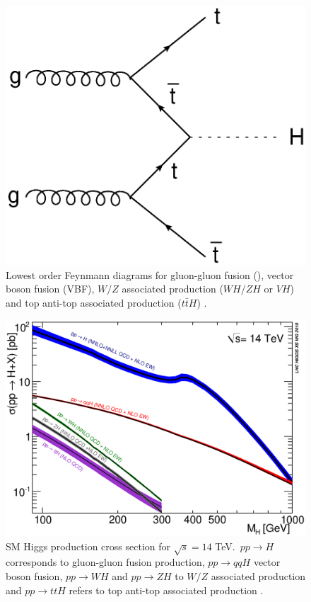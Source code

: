 \begin{figure}[h]
\begin{minipage}[h]{0.4\linewidth}
					\end{minipage}
					\quad\quad
					\begin{minipage}[h]{0.4\linewidth}
						\includegraphics[width=1\linewidth]{T/FIGS/tth}
					\end{minipage}
				\caption[Feynmann diagrams of lowest order Higgs production processes]{Lowest order Feynmann diagrams for gluon-gluon fusion (\ggF), vector boson fusion (VBF), $W/Z$ associated production ($WH/ZH$ or $VH$) and top anti-top associated production ($t\bar{t}H$) \cite{higgsproduction}.}
				\label{fig:higgsproddiag}
			\end{figure}

			\begin{figure}[h]
				\centering
				\includegraphics[width=0.7\linewidth]{T/FIGS/YRHXS_Summary_fig3}
				\caption[Higgs production cross section as a function of Higgs mass at a $\sqrt{s}=14$~TeV]{SM Higgs production cross section for $\sqrt{s}=14$ TeV. $\,pp\rightarrow H$ corresponds to gluon-gluon fusion production, $pp\rightarrow qqH$ vector boson fusion, $pp\rightarrow WH$ and $pp\rightarrow ZH$ to $W/Z$ associated production and  $pp\rightarrow ttH$ refers to top anti-top associated production \cite{LHCHiggsCS}.}
				\label{fig:higgsproductionCS}
			\end{figure}


